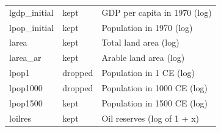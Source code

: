 \begin{tabular}{lll}
 lgdp\_initial                   & kept     & GDP per capita in 1970 (log)                                             \\
 lpop\_initial                   & kept     & Population in 1970 (log)                                                 \\
 larea                          & kept     & Total land area (log)                                                    \\
 larea\_ar                       & kept     & Arable land area (log)                                                   \\
 lpop1                          & dropped  & Population in 1 CE (log)                                                 \\
 lpop1000                       & dropped  & Population in 1000 CE (log)                                              \\
 lpop1500                       & kept     & Population in 1500 CE (log)                                              \\
 loilres                        & kept     & Oil reserves (log of 1 + x)                                              \\
\bottomrule
\end{tabular}